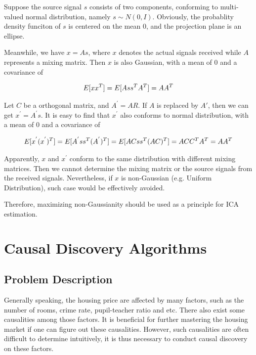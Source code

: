 \documentclass[12pt,a4paper]{article}
\theoremstyle{definition}
\begin{document}
\vspace{0.008\linewidth}
Suppose the source signal $s$ consists of two components, conforming to multi-valued normal distribution, namely $s \sim N(0,I)$. Obviously, the probablity density funciton of $s$ is centered on the mean 0, and the projection plane is an ellipse.

\vspace{0.008\linewidth}
Meanwhile, we have $x=As$, where $x$ denotes the actual signals received while $A$ represents a mixing matrix. Then $x$ is also Gaussian, with a mean of 0 and a covariance of 

\begin{equation*}
	\centering
	E[xx^{T}]=E[Ass^{T}A^{T}]=AA^{T}
\end{equation*}

\vspace{0.008\linewidth}
Let $C$ be a orthogonal matrix, and $A^{'}=AR$. If $A$ is replaced by $A{'}$, then we can get $x^{'}=A^{'}s$. It is easy to find that $x^{'}$ also conforms to normal distribution, with a mean of 0 and a covariance of

\begin{equation*}
	\centering
	E[x^{'}(x^{'})^{T}]=E[A^{'}ss^{T}(A^{'})^{T}]=E[ACss^{T}(AC)^{T}]=ACC^{T}A^{T}=AA^{T}
\end{equation*}

\vspace{0.008\linewidth}
Apparently, $x$ and $x^{'}$ conform to the same distribution with different mixing matrices. Then we cannot determine the mixing matrix or the source signals from the received signals. Nevertheless, if $x$ is non-Gaussian (e.g. Uniform Distribution), such case would be effectively avoided.

\vspace{0.008\linewidth}
Therefore, maximizing non-Gaussianity should be used as a principle for ICA estimation.

\section{Causal Discovery Algorithms}

\subsection{Problem Description}

Generally speaking, the housing price are affected by many factors, such as the number of rooms, crime rate, pupil-teacher ratio and etc. There also exist some causalities among those factors. It is beneficial for further mastering the housing market if one can figure out these causalities. However, such causalities are often difficult to determine intuitively, it is thus necessary to conduct causal discovery on these factors.
\end{document}
